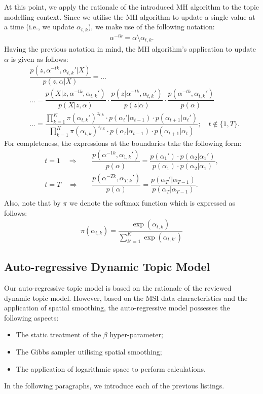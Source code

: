 \documentclass{mpaper}
\begin{document}
\par At this point, we apply the rationale of the introduced MH algorithm to the topic modelling context. Since we utilise the MH algorithm to update a single value at a time (i.e., we update $\alpha_{t,k}$), we make use of the following notation:
\begin{align*}
  \alpha^{-tk} = \alpha \setminus \alpha_{t,k}.
\end{align*} 
Having the previous notation in mind, the MH algorithm's application to update $\alpha$ is given as follows:
\begin{align*}
  &\dfrac{p(z,\alpha^{-tk},\alpha_{t, k}'|X)}{p(z,\alpha|X)} = \ldots\\
  &\ldots = \dfrac{p(X|z,\alpha^{-tk},\alpha_{t, k}')}{p(X|z,\alpha)}\cdot \dfrac{p(z|\alpha^{-tk},\alpha_{t, k}')}{p(z|\alpha)}\cdot \dfrac{p(\alpha^{-tk},\alpha_{t, k}')}{p(\alpha)}\\
  &\dots = \dfrac{\prod_{k=1}^K\pi(\alpha_{t,k}')^{z_{t,k}}\cdot p(\alpha_t'|\alpha_{t-1})\cdot p(\alpha_{t+1}|\alpha_t')}{\prod_{k=1}^K\pi(\alpha_{t,k})^{z_{t,k}}\cdot p(\alpha_t|\alpha_{t-1})\cdot p(\alpha_{t+1}|\alpha_t)};\quad t \not\in \{1,T\}.
\end{align*}
For completeness, the expressions at the boundaries take the following form:
\begin{align*}
t=1 \quad \Longrightarrow \quad &\dfrac{p(\alpha^{-1k},\alpha_{1, k}')}{p(\alpha)} = \dfrac{p(\alpha_{1}')\cdot p(\alpha_{2}|\alpha_{1}')}{p(\alpha_{1})\cdot p(\alpha_{2}|\alpha_{1})},\\
t=T \quad \Longrightarrow \quad &\dfrac{p(\alpha^{-Tk},\alpha_{T, k}')}{p(\alpha)} = \dfrac{p(\alpha_{T}'|\alpha_{T-1})}{p(\alpha_{T}|\alpha_{T-1})}.\\
\end{align*}
Also, note that by $\pi$ we denote the softmax function which is expressed as follows:
\begin{align*}
  \pi(\alpha_{t,k}) = \dfrac{\exp(\alpha_{t,k})}{\sum_{k'=1}^K \exp(\alpha_{t,k'})}
\end{align*} 

\subsection{Auto-regressive Dynamic Topic Model}

\par Our auto-regressive topic model is based on the rationale of the reviewed dynamic topic model. However, based on the MSI data characteristics and the application of spatial smoothing, the auto-regressive model possesses the following aspects:
\begin{itemize}
	\item The static treatment of the $\beta$ hyper-parameter;
	\item The Gibbs sampler utilising spatial smoothing;
	\item The application of logarithmic space to perform calculations.
\end{itemize}
In the following paragraphs, we introduce each of the previous listings.
\end{document}

